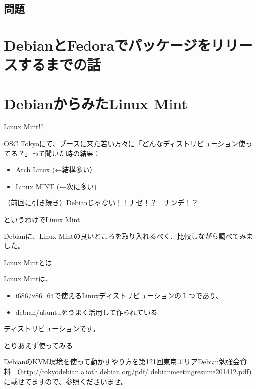 \subsection{問題}



\section{DebianとFedoraでパッケージをリリースするまでの話}

\section{DebianからみたLinux Mint}

\begin{frame}{Linux Mint!?}

  OSC Tokyoにて、ブースに来た若い方々に「どんなディストリビューション使ってる？」って聞いた時の結果：

\begin{itemize}
 \item Arch Linux (←結構多い）
 \item Linux MINT (←次に多い)
\end{itemize}

\begin{center}
{\LARGE （前回に引き続き）Debianじゃない！！ナゼ！？　ナンデ！？}
\end{center}
\end{frame}

\begin{frame}{というわけでLinux Mint}

 Debianに、Linux Mintの良いところを取り入れるべく、比較しながら調べてみました。
  
\end{frame}

\begin{frame}{Linux Mintとは}

  Linux Mintは、
\begin{itemize}
\item i686/x86\_64で使えるLinuxディストリビューションの１つであり、
\item debian/ubuntuをうまく活用して作られている
\end{itemize}
ディストリビューションです。
\end{frame}

\begin{frame}{とりあえず使ってみる}

  DebianのKVM環境を使って動かすやり方を第121回東京エリアDebian勉強会資料
  （\url{http://tokyodebian.alioth.debian.org/pdf/ debianmeetingresume201412.pdf})
に載せてますので、参照くださいませ。
    
\end{frame}

